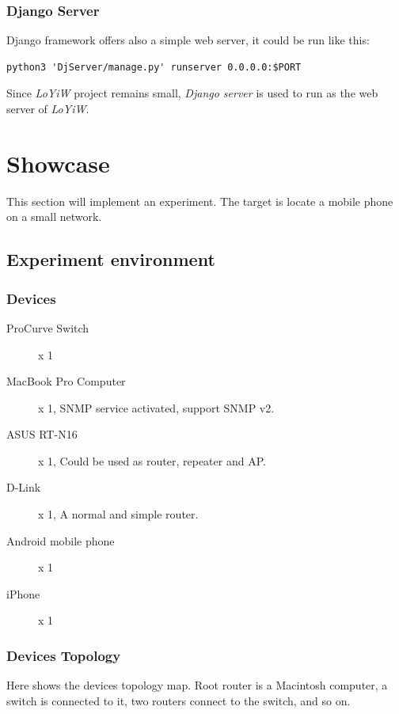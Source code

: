 \subsubsection{Django Server}
Django framework offers also a simple web server, it could be run like this:

\begin{lstlisting}[caption={Sample of run Django server, see \textit{LoYiW/shells/mac.sh} for more details.}]
python3 'DjServer/manage.py' runserver 0.0.0.0:$PORT
\end{lstlisting}

Since \textit{LoYiW} project remains small, \textit{Django server} is used to run as the web server of \textit{LoYiW}.

\section{Showcase}

This section will implement an experiment. The target is locate a mobile phone on a small network.

\subsection{Experiment environment}
\subsubsection{Devices}
\begin{description}
	\item[ProCurve Switch] x 1
	\item[MacBook Pro Computer] x 1, SNMP service activated, support SNMP v2.
	\item[ASUS RT-N16] x 1, Could be used as router, repeater and AP.
	\item[D-Link] x 1, A normal and simple router.
\end{description}

\begin{description}
	\item[Android mobile phone] x 1
	\item[iPhone] x 1
\end{description}

\subsubsection{Devices Topology}
Here shows the devices topology map. Root router is a Macintosh computer, a switch is connected to it, two routers connect to the switch, and so on.

